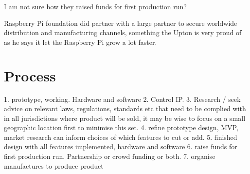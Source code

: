 I am not sure how they raised funds for first production run?

Raspberry Pi foundation did partner with a large partner to secure worldwide distribution and manufacturing channels, something the Upton is very proud of as he says it let the Raspberry Pi grow a lot faster.

\section{Process}
1. prototype, working. Hardware and software
2. Control IP.
3. Research / seek advice on relevant laws, regulations, standards etc that need to be complied with in all jurisdictions where product will be sold, it may be wise to focus on a small geographic location first to minimise this set.
4. refine prototype design, MVP, market research can inform choices of which features to cut or add.
5. finished design with all features implemented, hardware and software
6. raise funds for first production run. Partnership or crowd funding or both.
7. organise manufactures to produce product